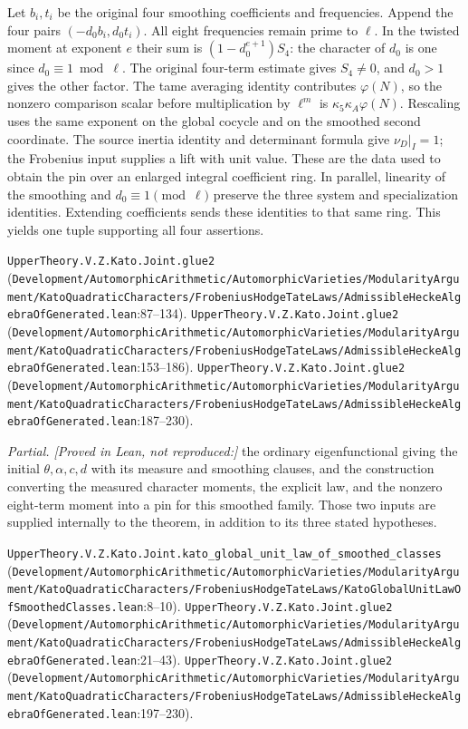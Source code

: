 Let $b_i,t_i$ be the original four smoothing coefficients and frequencies. Append the four pairs $(-d_0b_i,d_0t_i)$. All eight frequencies remain prime to $\ell$. In the twisted moment at exponent $e$ their sum is $(1-d_0^{e+1})S_4$: the character of $d_0$ is one since $d_0\equiv1\bmod\ell$. The original four-term estimate gives $S_4\ne0$, and $d_0>1$ gives the other factor. The tame averaging identity contributes $\varphi(N)$, so the nonzero comparison scalar before multiplication by $\ell^m$ is $\kappa_5\kappa_A\varphi(N)$. Rescaling uses the same exponent on the global cocycle and on the smoothed second coordinate. The source inertia identity and determinant formula give $\nu_D|_I=1$; the Frobenius input supplies a lift with unit value. These are the data used to obtain the pin over an enlarged integral coefficient ring. In parallel, linearity of the smoothing and $d_0\equiv1\pmod\ell$ preserve the three system and specialization identities. Extending coefficients sends these identities to that same ring. This yields one tuple supporting all four assertions.
\par{\footnotesize \nolinkurl{UpperTheory.V.Z.Kato.Joint.glue2} (\nolinkurl{Development/AutomorphicArithmetic/AutomorphicVarieties/ModularityArgument/KatoQuadraticCharacters/FrobeniusHodgeTateLaws/AdmissibleHeckeAlgebraOfGenerated.lean}\allowbreak:87--134). \nolinkurl{UpperTheory.V.Z.Kato.Joint.glue2} (\nolinkurl{Development/AutomorphicArithmetic/AutomorphicVarieties/ModularityArgument/KatoQuadraticCharacters/FrobeniusHodgeTateLaws/AdmissibleHeckeAlgebraOfGenerated.lean}\allowbreak:153--186). \nolinkurl{UpperTheory.V.Z.Kato.Joint.glue2} (\nolinkurl{Development/AutomorphicArithmetic/AutomorphicVarieties/ModularityArgument/KatoQuadraticCharacters/FrobeniusHodgeTateLaws/AdmissibleHeckeAlgebraOfGenerated.lean}\allowbreak:187--230).\par}

\emph{Partial. [Proved in Lean, not reproduced:]} the ordinary eigenfunctional giving the initial $\theta,\alpha,c,d$ with its measure and smoothing clauses, and the construction converting the measured character moments, the explicit law, and the nonzero eight-term moment into a pin for this smoothed family. Those two inputs are supplied internally to the theorem, in addition to its three stated hypotheses.
\par{\footnotesize \nolinkurl{UpperTheory.V.Z.Kato.Joint.kato_global_unit_law_of_smoothed_classes} (\nolinkurl{Development/AutomorphicArithmetic/AutomorphicVarieties/ModularityArgument/KatoQuadraticCharacters/FrobeniusHodgeTateLaws/KatoGlobalUnitLawOfSmoothedClasses.lean}\allowbreak:8--10). \nolinkurl{UpperTheory.V.Z.Kato.Joint.glue2} (\nolinkurl{Development/AutomorphicArithmetic/AutomorphicVarieties/ModularityArgument/KatoQuadraticCharacters/FrobeniusHodgeTateLaws/AdmissibleHeckeAlgebraOfGenerated.lean}\allowbreak:21--43). \nolinkurl{UpperTheory.V.Z.Kato.Joint.glue2} (\nolinkurl{Development/AutomorphicArithmetic/AutomorphicVarieties/ModularityArgument/KatoQuadraticCharacters/FrobeniusHodgeTateLaws/AdmissibleHeckeAlgebraOfGenerated.lean}\allowbreak:197--230).\par}

